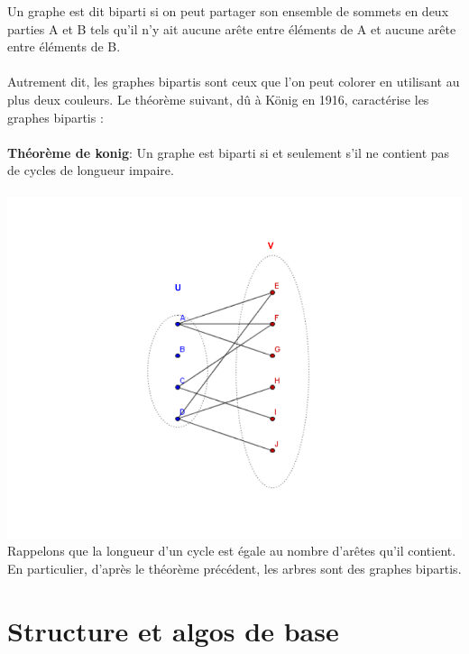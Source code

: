 \documentclass[a4paper,12pt,openany]{book}
\begin{document}
Un graphe est dit biparti si on peut partager son ensemble de sommets en deux parties A et B tels qu'il n'y ait aucune arête entre éléments de A et aucune arête entre éléments de B.\\
\\
Autrement dit, les graphes bipartis sont ceux que l'on peut colorer en utilisant au plus deux couleurs. Le théorème suivant, dû à König en 1916, caractérise les graphes bipartis :\\
\\
\textbf{Théorème de konig}: Un graphe est biparti si et seulement s'il ne contient pas de cycles de longueur impaire.\\
\\
\includegraphics[width=1\linewidth,center]{img/g-bipartie.png}
\\
Rappelons que la longueur d'un cycle est égale au nombre d'arêtes qu'il contient. En particulier, d'après le théorème précédent, les arbres sont des graphes bipartis.




\chapter{Structure et algos de base}
\end{document}
